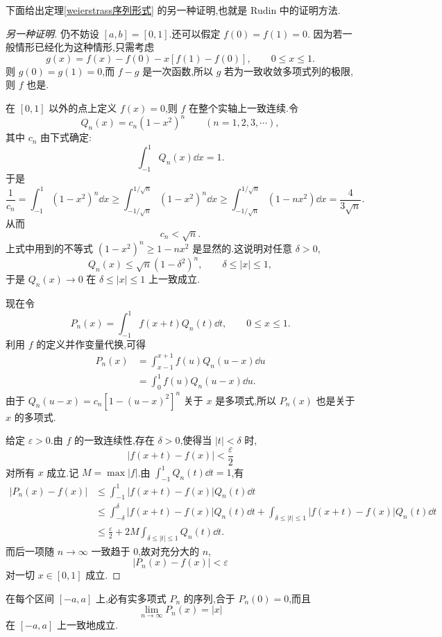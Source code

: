 下面给出定理\ref{weierstrass序列形式} 的另一种证明,也就是 Rudin 中的证明方法.

\begin{proof}[另一种证明]
	仍不妨设 $[a,b]=[0,1]$.还可以假定 $f(0)=f(1)=0$. 因为若一般情形已经化为这种情形,只需考虑
	\[
	g(x)=f(x)-f(0)-x[f(1)-f(0)],\qquad 0\leqslant x\leqslant 1.
	\]
	则 $g(0)=g(1)=0$,而 $f-g$ 是一次函数,所以 $g$ 若为一致收敛多项式列的极限,则 $f$ 也是.
	
	在 $[0,1]$ 以外的点上定义 $f(x)=0$,则 $f$ 在整个实轴上一致连续.令
	\[
	Q_n(x)=c_n(1-x^2)^n\qquad (n=1,2,3,\cdots),
	\]
	其中 $c_n$ 由下式确定:
	\[
	\int_{-1}^{1}Q_n(x)\dd x=1.
	\]
	于是
	\[
	\frac1{c_n}=\int_{-1}^{1}(1-x^2)^n\dd x
	\geqslant \int_{-1/\sqrt n}^{1/\sqrt n}(1-x^2)^n\dd x
	\geqslant \int_{-1/\sqrt n}^{1/\sqrt n}(1-nx^2)\dd x
	=\frac{4}{3\sqrt n}.
	\]
	从而
	\[
	c_n<\sqrt n.
	\]
	上式中用到的不等式 $(1-x^2)^n\geqslant 1-nx^2$ 是显然的.这说明对任意 $\delta>0$,
	\[
	Q_n(x)\leqslant \sqrt n(1-\delta^2)^n,
	\qquad \delta\leqslant |x|\leqslant 1,
	\]
	于是 $Q_n(x)\to0$ 在 $\delta\leqslant |x|\leqslant1$ 上一致成立.
	
	现在令
	\[
	P_n(x)=\int_{-1}^{1}f(x+t)Q_n(t)\dd t,
	\qquad 0\leqslant x\leqslant1.
	\]
	利用 $f$ 的定义并作变量代换,可得
	\[
	\begin{aligned}
		P_n(x)&=\int_{x-1}^{x+1}f(u)Q_n(u-x)\dd u\\
		&=\int_0^1 f(u)Q_n(u-x)\dd u.
	\end{aligned}
	\]
	由于 $Q_n(u-x)=c_n[1-(u-x)^2]^n$ 关于 $x$ 是多项式,所以 $P_n(x)$ 也是关于 $x$ 的多项式.
	
	给定 $\varepsilon>0$.由 $f$ 的一致连续性,存在 $\delta>0$,使得当 $|t|<\delta$ 时,
	\[
	|f(x+t)-f(x)|<\frac{\varepsilon}{2}
	\]
	对所有 $x$ 成立.记 $M=\max |f|$.由 $\int_{-1}^{1}Q_n(t)\dd t=1$,有
	\[
	\begin{aligned}
		|P_n(x)-f(x)|
		&\leqslant \int_{-1}^{1}|f(x+t)-f(x)|Q_n(t)\dd t\\
		&\leqslant \int_{-\delta}^{\delta}|f(x+t)-f(x)|Q_n(t)\dd t
		+\int_{\delta\leqslant |t|\leqslant1}|f(x+t)-f(x)|Q_n(t)\dd t\\
		&\leqslant \frac{\varepsilon}{2}+2M\int_{\delta\leqslant |t|\leqslant1}Q_n(t)\dd t.
	\end{aligned}
	\]
	而后一项随 $n\to\infty$ 一致趋于 $0$,故对充分大的 $n$,
	\[
	|P_n(x)-f(x)|<\varepsilon
	\]
	对一切 $x\in[0,1]$ 成立.
\end{proof}

\begin{corollary}\label{绝对值多项式逼近}
	在每个区间 $[-a,a]$ 上,必有实多项式 $P_n$ 的序列,合于 $P_n(0)=0$,而且
	\[
	\lim_{n\to\infty}P_n(x)=|x|
	\]
	在 $[-a,a]$ 上一致地成立.
\end{corollary}

